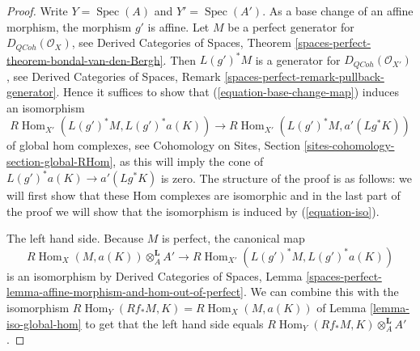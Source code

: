 \documentclass{stacks-project}
\theoremstyle{plain}
\theoremstyle{definition}
\theoremstyle{remark}
\numberwithin{equation}{subsection}
\def\Spec{\mathop{\mathrm{Spec}}}
\def\Hom{\mathop{\mathrm{Hom}}\nolimits}
\def\QCoh{\mathit{QCoh}}
\begin{document}
\begin{proof}
Write $Y = \Spec(A)$ and $Y' = \Spec(A')$. As a base change of an affine
morphism, the morphism $g'$ is affine. Let $M$ be a perfect generator
for $D_\QCoh(\mathcal{O}_X)$, see Derived Categories of Spaces, Theorem
\ref{spaces-perfect-theorem-bondal-van-den-Bergh}. Then $L(g')^*M$ is a
generator for $D_\QCoh(\mathcal{O}_{X'})$, see
Derived Categories of Spaces, Remark
\ref{spaces-perfect-remark-pullback-generator}.
Hence it suffices to show that (\ref{equation-base-change-map})
induces an isomorphism
\begin{equation}
\label{equation-iso}
R\Hom_{X'}(L(g')^*M, L(g')^*a(K))
\longrightarrow
R\Hom_{X'}(L(g')^*M, a'(Lg^*K))
\end{equation}
of global hom complexes, see
Cohomology on Sites, Section \ref{sites-cohomology-section-global-RHom},
as this will imply the cone of $L(g')^*a(K) \to a'(Lg^*K)$
is zero.
The structure of the proof is as follows: we will first show that
these Hom complexes are isomorphic and in the last part of the proof
we will show that the isomorphism is induced by (\ref{equation-iso}).

\medskip\noindent
The left hand side. Because $M$ is perfect, the canonical map
$$
R\Hom_X(M, a(K)) \otimes^\mathbf{L}_A A'
\longrightarrow
R\Hom_{X'}(L(g')^*M, L(g')^*a(K))
$$
is an isomorphism by Derived Categories of Spaces, Lemma
\ref{spaces-perfect-lemma-affine-morphism-and-hom-out-of-perfect}.
We can combine this with the isomorphism
$R\Hom_Y(Rf_*M, K) = R\Hom_X(M, a(K))$
of Lemma \ref{lemma-iso-global-hom}
to get that the left hand side equals
$R\Hom_Y(Rf_*M, K) \otimes^\mathbf{L}_A A'$.


\end{proof}
\end{document}

